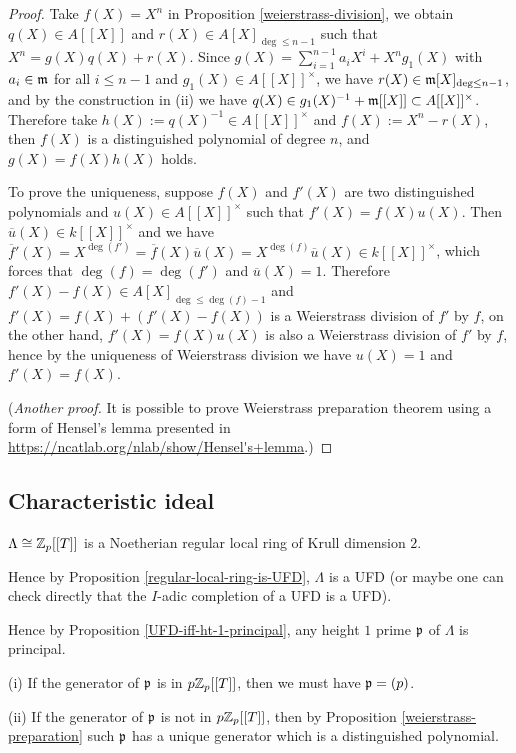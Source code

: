 \begin{proof}
Take $f(X)=X^n$ in Proposition \ref{weierstrass-division}, we obtain $q(X)\in A[[X]]$
and $r(X)\in A[X]_{\deg\leq n-1}$ such that $X^n=g(X)q(X)+r(X)$.
Since $g(X)=\sum_{i=1}^{n-1}a_iX^i+X^ng_1(X)$
with $a_i\in{\mathfrak{m}}$ for all $i\leq n-1$ and $g_1(X)\in A[[X]]^\times$,
we have $r(X)\in{\mathfrak{m}}[X]_{\deg\leq n-1}$, and by the construction in (ii)
we have $q(X)\in g_1(X)^{-1}+{\mathfrak{m}}[[X]]\subset A[[X]]^\times$.
Therefore take $h(X):=q(X)^{-1}\in A[[X]]^\times$
and $f(X):=X^n-r(X)$, then $f(X)$ is a distinguished polynomial of degree $n$,
and $g(X)=f(X)h(X)$ holds.

To prove the uniqueness, suppose $f(X)$ and $f'(X)$ are two distinguished polynomials
and $u(X)\in A[[X]]^\times$ such that $f'(X)=f(X)u(X)$.
Then $\overline u(X)\in k[[X]]^\times$ and we have
$\overline f{}'(X)=X^{\deg(f')}=\overline f(X)\overline u(X)
=X^{\deg(f)}\overline u(X)\in k[[X]]^\times$,
which forces that $\deg(f)=\deg(f')$ and $\overline u(X)=1$.
Therefore $f'(X)-f(X)\in A[X]_{\deg\leq\deg(f)-1}$
and $f'(X)=f(X)+(f'(X)-f(X))$ is a Weierstrass division of $f'$ by $f$,
on the other hand, $f'(X)=f(X)u(X)$ is also a Weierstrass division of $f'$ by $f$,
hence by the uniqueness of Weierstrass division
we have $u(X)=1$ and $f'(X)=f(X)$.

(\emph{Another proof.}
It is possible to prove Weierstrass preparation theorem using a form
of Hensel's lemma presented in \url{https://ncatlab.org/nlab/show/Hensel's+lemma}.)
\end{proof}

\subsection{Characteristic ideal}

\begin{prop}
\label{Lambda-is-reg-of-dim-2}
$\Lambda\cong{\mathbb {Z}}_p[[T]]$ is a
Noetherian regular local ring of Krull dimension $2$.
\end{prop}

\begin{cor}
\label{Lambda-is-UFD}
Hence by Proposition \ref{regular-local-ring-is-UFD}, $\Lambda$ is a UFD
(or maybe one can check directly that the $I$-adic completion of a UFD is a UFD).
\end{cor}

\begin{cor}
\label{Lambda-ht-1-principal}
Hence by Proposition \ref{UFD-iff-ht-1-principal}, any height $1$ prime ${\mathfrak{p}}$ of $\Lambda$
is principal.

{\rm(i)}
If the generator of ${\mathfrak{p}}$ is in $p{\mathbb {Z}}_p[[T]]$, then
we must have ${\mathfrak{p}}=(p)$.

{\rm(ii)}
If the generator of ${\mathfrak{p}}$ is not in $p{\mathbb {Z}}_p[[T]]$, then
by Proposition \ref{weierstrass-preparation} such ${\mathfrak{p}}$
has a unique generator which is a distinguished polynomial.
\end{cor}

